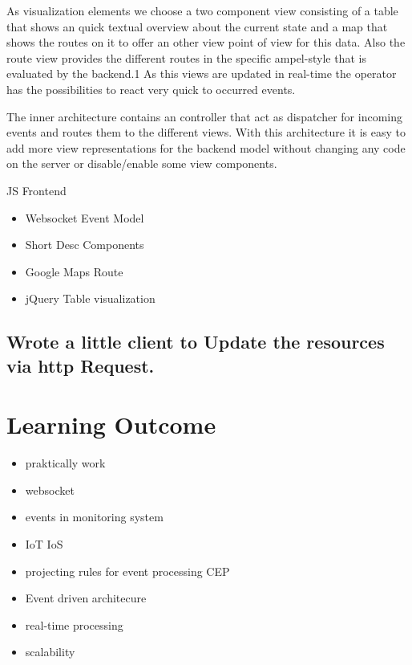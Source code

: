 \documentclass{acm_proc_article-sp}
\begin{document}
As visualization elements we choose a two component view consisting of a table that shows an quick textual overview about the current state and a map that shows the routes on it to offer an other view point of view for this data. Also the route view provides the different routes in the specific ampel-style that is evaluated by the backend.1
As this views are updated in real-time the operator has the possibilities to react very quick to occurred events.

The inner architecture contains an controller that act as dispatcher for incoming events and routes them to the different views. With this architecture it is easy to add more view representations for the backend model without changing any code on the server or disable/enable some view components.

JS Frontend
		\begin{itemize}
			\item Websocket Event Model
			\item Short Desc Components
			\item Google Maps Route
			\item jQuery Table visualization
		\end{itemize}
		
		
\subsection{Wrote a little client to Update the resources via http Request.}

\section{Learning Outcome}

\begin{itemize}
	\item praktically work
	\item websocket
	\item events in monitoring system
\end{itemize}

\begin{itemize}
	\item IoT IoS
	\item projecting rules for event processing CEP
	\item Event driven architecure 
	\item real-time processing
	\item scalability
\end{itemize}
\end{document}
